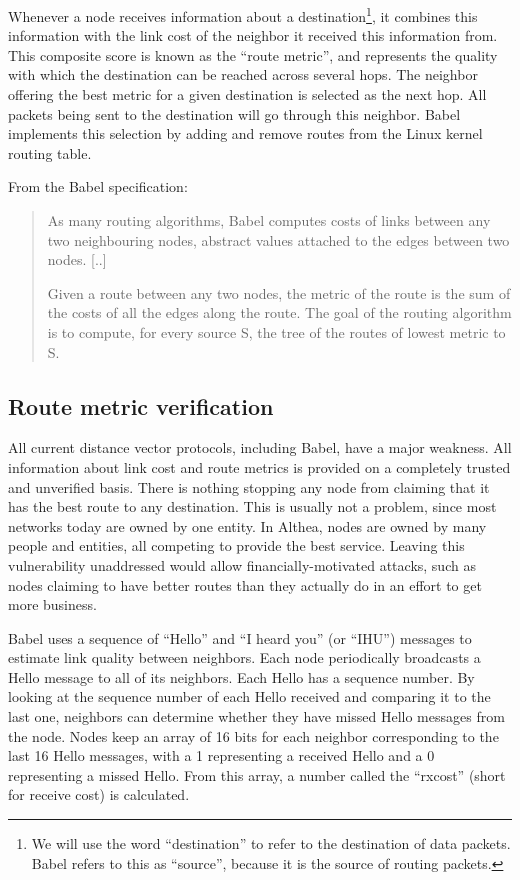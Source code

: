 \documentclass[11pt]{article}
\newlength{\currentparskip}
\newenvironment{unbreakable}
  {\setlength{\currentparskip}{\parskip}%
	 \vspace{\currentparskip}
   \begin{minipage}{\textwidth}%
   \setlength{\parskip}{\currentparskip}%
  }
  {\end{minipage}\vspace{\currentparskip}}
\begin{document}
Whenever a node receives information about a destination\footnote{We will use the word ``destination'' to refer to the destination of data packets. Babel refers to this as ``source'', because it is the source of routing packets.}, it combines this information with the link cost of the neighbor it received this information from. This composite score is known as the ``route metric'', and represents the quality with which the destination can be reached across several hops. The neighbor offering the best metric for a given destination is selected as the next hop. All packets being sent to the destination will go through this neighbor. Babel implements this selection by adding and remove routes from the Linux kernel routing table.
 
\begin{unbreakable}
From the Babel specification:
\begin{quote}
As many routing algorithms, Babel computes costs of links between any two neighbouring nodes, abstract values attached to the edges between two nodes.  [..]

Given a route between any two nodes, the metric of the route is the sum of the costs of all the edges along the route. The goal of the routing algorithm is to compute, for every source S, the tree of the routes of lowest metric to S.
\end{quote}
\end{unbreakable}

\subsection{Route metric verification}
All current distance vector protocols, including Babel, have a major weakness. All information about link cost and route metrics is provided on a completely trusted and unverified basis. There is nothing stopping any node from claiming that it has the best route to any destination. This is usually not a problem, since most networks today are owned by one entity. In Althea, nodes are owned by many people and entities, all competing to provide the best service. Leaving this vulnerability unaddressed would allow financially-motivated attacks, such as nodes claiming to have better routes than they actually do in an effort to get more business.
 
Babel uses a sequence of ``Hello'' and ``I heard you'' (or ``IHU'') messages to estimate link quality between neighbors. Each node periodically broadcasts a Hello message to all of its neighbors. Each Hello has a sequence number. By looking at the sequence number of each Hello received and comparing it to the last one, neighbors can determine whether they have missed Hello messages from the node. Nodes keep an array of 16 bits for each neighbor corresponding to the last 16 Hello messages, with a 1 representing a received Hello and a 0 representing a missed Hello. From this array, a number called the ``rxcost'' (short for receive cost) is calculated.
\end{document}
